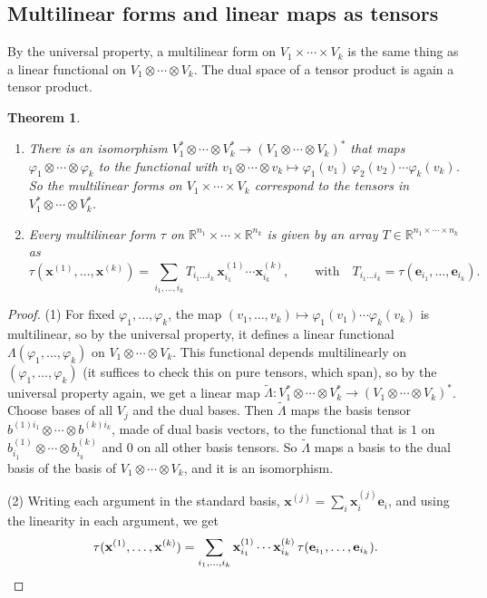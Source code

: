 \documentclass[11pt]{article}
\theoremstyle{definition}
\theoremstyle{plain}
\newtheorem{theorem}[definition]{Theorem}
\theoremstyle{remark}
\begin{document}
\subsection{Multilinear forms and linear maps as tensors}

By the universal property, a multilinear form on $V_1 \times \cdots \times V_k$ is the same thing as a linear functional on $V_1 \otimes \cdots \otimes V_k$. The dual space of a tensor product is again a tensor product.

\begin{theorem}\label{thm:multilinear-tensor}
    \begin{enumerate}
        \item There is an isomorphism $V_1^* \otimes \cdots \otimes V_k^* \to (V_1 \otimes \cdots \otimes V_k)^*$ that maps $\varphi_1 \otimes \cdots \otimes \varphi_k$ to the functional with $v_1 \otimes \cdots \otimes v_k \mapsto \varphi_1(v_1)\,\varphi_2(v_2) \cdots \varphi_k(v_k)$. So the multilinear forms on $V_1 \times \cdots \times V_k$ correspond to the tensors in $V_1^* \otimes \cdots \otimes V_k^*$.
        \item Every multilinear form $\tau$ on $\mathbb{R}^{n_1} \times \cdots \times \mathbb{R}^{n_k}$ is given by an array $T \in \mathbb{R}^{n_1 \times \cdots \times n_k}$ as
        \[\tau(\mathbf{x}^{(1)}, \ldots, \mathbf{x}^{(k)}) = \sum_{i_1, \ldots, i_k} T_{i_1 \ldots i_k}\, \mathbf{x}^{(1)}_{i_1} \cdots \mathbf{x}^{(k)}_{i_k}, \qquad \text{with} \quad T_{i_1 \ldots i_k} = \tau(\mathbf{e}_{i_1}, \ldots, \mathbf{e}_{i_k}).\]
    \end{enumerate}
\end{theorem}

\begin{proof}
    (1) For fixed $\varphi_1, \ldots, \varphi_k$, the map $(v_1, \ldots, v_k) \mapsto \varphi_1(v_1) \cdots \varphi_k(v_k)$ is multilinear, so by the universal property, it defines a linear functional $\Lambda(\varphi_1, \ldots, \varphi_k)$ on $V_1 \otimes \cdots \otimes V_k$. This functional depends multilinearly on $(\varphi_1, \ldots, \varphi_k)$ (it suffices to check this on pure tensors, which span), so by the universal property again, we get a linear map $\tilde\Lambda: V_1^* \otimes \cdots \otimes V_k^* \to (V_1 \otimes \cdots \otimes V_k)^*$. Choose bases of all $V_j$ and the dual bases. Then $\tilde\Lambda$ maps the basis tensor $b^{(1)i_1} \otimes \cdots \otimes b^{(k)i_k}$, made of dual basis vectors, to the functional that is $1$ on $b^{(1)}_{i_1} \otimes \cdots \otimes b^{(k)}_{i_k}$ and $0$ on all other basis tensors. So $\tilde\Lambda$ maps a basis to the dual basis of the basis of $V_1 \otimes \cdots \otimes V_k$, and it is an isomorphism.

    (2) Writing each argument in the standard basis, $\mathbf{x}^{(j)} = \sum_{i} \mathbf{x}^{(j)}_{i} \mathbf{e}_{i}$, and using the linearity in each argument, we get
    \[\tau(\mathbf{x}^{(1)}, \ldots, \mathbf{x}^{(k)}) = \sum_{i_1, \ldots, i_k} \mathbf{x}^{(1)}_{i_1} \cdots \mathbf{x}^{(k)}_{i_k}\, \tau(\mathbf{e}_{i_1}, \ldots, \mathbf{e}_{i_k}). \qedhere\]
\end{proof}
\end{document}
